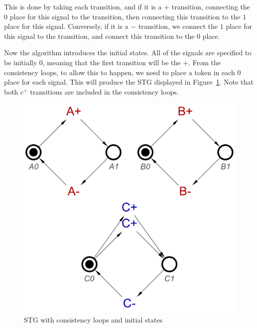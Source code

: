 \documentclass[british,conference,compsoc]{IEEEtran}
\begin{document}
This is done by taking each transition, and if it is a $+$ transition, 
connecting the $0$ place for this signal to the transition, then connecting 
this transition to the $1$ place for this signal. Conversely, if it is a $-$ 
transition, we connect the $1$ place for this signal to the transition, and 
connect this transition to the $0$ place.


Now the algorithm introduces the initial states. All of the signals are 
specified to be initially 0, meaning that the first transition will be the $+$.
From the consistency loops, to allow this to happen, we need to place a token 
in each $0$ place for each signal. This will produce the STG displayed in 
Figure~\ref{fig:tokens}. Note that both $c^{+}$ transitions are 
included in the consistency loops.

\begin{figure}[h]
\vspace{-4mm}
\begin{centering}
\includegraphics[scale=0.3]{Images/or-gate-inits-stg}
\par\end{centering}
\protect\caption{\label{fig:tokens} STG with consistency loops and 
			initial states}
\vspace{-1mm}
\end{figure}
\end{document}

